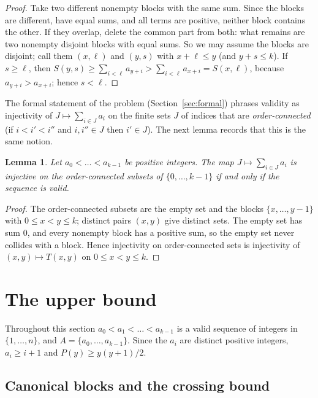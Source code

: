 \documentclass[11pt]{amsart}
\newtheorem{lemma}[theorem]{Lemma}
\theoremstyle{remark}
\begin{document}
\begin{proof}
Take two different nonempty blocks with the same sum. Since the blocks are different, have equal sums, and all terms are positive,
neither block contains the other. If they overlap, delete the common part from both: what remains are two nonempty disjoint blocks with
equal sums. So we may assume the blocks are disjoint; call them $(x,\ell)$ and $(y,s)$ with $x+\ell\le y$ (and $y+s\le k$). If
$s\ge\ell$, then $S(y,s)\ge\sum_{i<\ell}a_{y+i}>\sum_{i<\ell}a_{x+i}=S(x,\ell)$, because $a_{y+i}>a_{x+i}$; hence $s<\ell$.
\end{proof}

The formal statement of the problem (Section~\ref{sec:formal}) phrases validity as injectivity of $J\mapsto\sum_{i\in J}a_i$ on the
finite sets $J$ of indices that are \emph{order-connected} (if $i<i'<i''$ and $i,i''\in J$ then $i'\in J$). The next lemma records that
this is the same notion.

\begin{lemma}\label{lem:formal}
Let $a_0<\dots<a_{k-1}$ be positive integers. The map $J\mapsto\sum_{i\in J}a_i$ is injective on the order-connected subsets of
$\{0,\dots,k-1\}$ if and only if the sequence is valid.
\end{lemma}

\begin{proof}
The order-connected subsets are the empty set and the blocks $\{x,\dots,y-1\}$ with $0\le x<y\le k$; distinct pairs $(x,y)$ give distinct
sets. The empty set has sum $0$, and every nonempty block has a positive sum, so the empty set never collides with a block. Hence
injectivity on order-connected sets is injectivity of $(x,y)\mapsto T(x,y)$ on $0\le x<y\le k$.
\end{proof}

\section{The upper bound}\label{sec:upper}

Throughout this section $a_0<a_1<\dots<a_{k-1}$ is a valid sequence of integers in $\{1,\dots,n\}$, and $A=\{a_0,\dots,a_{k-1}\}$.
Since the $a_i$ are distinct positive integers, $a_i\ge i+1$ and $P(y)\ge y(y+1)/2$.

\subsection{Canonical blocks and the crossing bound}
\end{document}
